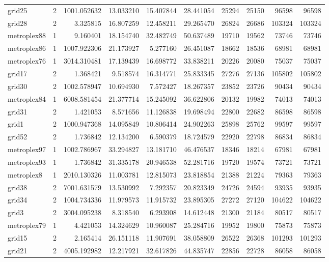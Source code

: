 \begin{longtable}{|l|r|r|r|r|r|r|r|r|r|}
grid25 & 2 & 1001.052632 & 13.033210 & 15.407844 & 28.441054 & 25294 & 25150 & 96598 & 96598 \\
grid28 & 2 & 3.325815 & 16.807259 & 12.458211 & 29.265470 & 26824 & 26686 & 103324 & 103324 \\
metroplex88 & 1 & 9.160401 & 18.154740 & 32.482749 & 50.637489 & 19710 & 19562 & 73746 & 73746 \\
metroplex86 & 1 & 1007.922306 & 21.173927 & 5.277160 & 26.451087 & 18662 & 18536 & 68981 & 68981 \\
metroplex76 & 1 & 3014.310481 & 17.139439 & 16.698772 & 33.838211 & 20226 & 20080 & 75037 & 75037 \\
grid17 & 2 & 1.368421 & 9.518574 & 16.314771 & 25.833345 & 27276 & 27136 & 105802 & 105802 \\
grid30 & 2 & 1002.578947 & 10.694930 & 7.572427 & 18.267357 & 23852 & 23726 & 90434 & 90434 \\
metroplex84 & 1 & 6008.581454 & 21.377714 & 15.245092 & 36.622806 & 20132 & 19982 & 74013 & 74013 \\
grid31 & 2 & 1.421053 & 8.571656 & 11.126838 & 19.698494 & 22800 & 22682 & 86598 & 86598 \\
grid1 & 2 & 1000.947368 & 14.095849 & 10.806414 & 24.902263 & 25898 & 25762 & 99597 & 99597 \\
grid52 & 2 & 1.736842 & 12.134200 & 6.590379 & 18.724579 & 22920 & 22798 & 86834 & 86834 \\
metroplex97 & 1 & 1002.786967 & 33.294827 & 13.181710 & 46.476537 & 18346 & 18214 & 67981 & 67981 \\
metroplex93 & 1 & 1.736842 & 31.335178 & 20.946538 & 52.281716 & 19720 & 19574 & 73721 & 73721 \\
metroplex8 & 1 & 2010.130326 & 11.003781 & 12.815073 & 23.818854 & 21388 & 21224 & 79363 & 79363 \\
grid38 & 2 & 7001.631579 & 13.530992 & 7.292357 & 20.823349 & 24726 & 24594 & 93935 & 93935 \\
grid34 & 2 & 1004.734336 & 11.979573 & 11.915732 & 23.895305 & 27272 & 27120 & 104622 & 104622 \\
grid3 & 2 & 3004.095238 & 8.318540 & 6.293908 & 14.612448 & 21300 & 21184 & 80517 & 80517 \\
metroplex79 & 1 & 4.421053 & 14.324629 & 10.960087 & 25.284716 & 19952 & 19800 & 75873 & 75873 \\
grid15 & 2 & 2.165414 & 26.151118 & 11.907691 & 38.058809 & 26522 & 26368 & 101293 & 101293 \\
grid21 & 2 & 4005.192982 & 12.217921 & 32.617826 & 44.835747 & 22856 & 22728 & 86058 & 86058 \\

\end{longtable}
